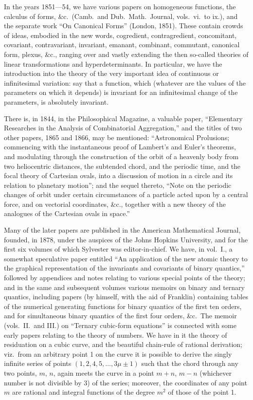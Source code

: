 \documentclass[11pt,a4paper]{book}
\begin{document}
In the years 1851---54, we have various papers on homogeneous functions, the calculus of forms, \&c.\ (Camb.\ and Dub.\ Math.\ Journal, vols.\ vi.\ to ix.), and the separate work ``On Canonical Forms'' (London, 1851). These contain crowds of ideas, embodied in the new words, cogredient, contragredient, concomitant, covariant, contravariant, invariant, emanant, combinant, commutant, canonical form, plexus, \&c., ranging over and vastly extending the then so-called theories of linear transformations and hyperdeterminants. In particular, we have the introduction into the theory of the very important idea of continuous or infinitesimal variation: say that a function, which (whatever are the values of the parameters on which it depends) is invariant for an infinitesimal change of the parameters, is absolutely invariant.

There is, in 1844, in the Philosophical Magazine, a valuable paper, ``Elementary Researches in the Analysis of Combinatorial Aggregation,'' and the titles of two other papers, 1865 and 1866, may be mentioned: ``Astronomical Prolusions; commencing with the instantaneous proof of Lambert's and Euler's theorems, and modulating through the construction of the orbit of a heavenly body from two heliocentric distances, the subtended chord, and the periodic time, and the focal theory of Cartesian ovals, into a discussion of motion in a circle and its relation to planetary motion''; and the sequel thereto, ``Note on the periodic changes of orbit under certain circumstances of a particle acted upon by a central force, and on vectorial coordinates, \&c., together with a new theory of the analogues of the Cartesian ovals in space.''

Many of the later papers are published in the American Mathematical Journal, founded, in 1878, under the auspices of the Johns Hopkins University, and for the first six volumes of which Sylvester was editor-in-chief. We have, in vol.\ I., a somewhat speculative paper entitled ``An application of the new atomic theory to the graphical representation of the invariants and covariants of binary quantics,'' followed by appendices and notes relating to various special points of the theory; and in the same and subsequent volumes various memoirs on binary and ternary quantics, including papers (by himself, with the aid of Franklin) containing tables of the numerical generating functions for binary quantics of the first ten orders, and for simultaneous binary quantics of the first four orders, \&c.\ The memoir (vols.\ II.\ and III.) on ``Ternary cubic-form equations'' is connected with some early papers relating to the theory of numbers. We have in it the theory of residuation on a cubic curve, and the beautiful chain-rule of rational derivation; viz.\ from an arbitrary point 1 on the curve it is possible to derive the singly infinite series of points $(1, 2, 4, 5, \ldots, 3\mu \pm 1)$ such that the chord through any two points, $m$, $n$, again meets the curve in a point $m + n$, $m - n$ (whichever number is not divisible by 3) of the series; moreover, the coordinates of any point $m$ are rational and integral functions of the degree $m^2$ of those of the point 1.
\end{document}

